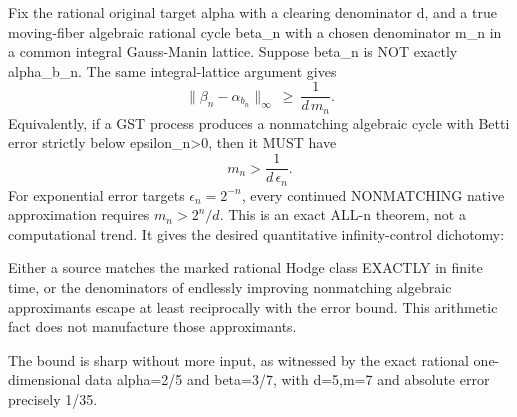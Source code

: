 \documentclass{article}
\begin{document}
Fix the rational original target alpha with
a clearing denominator d, and a true
moving-fiber algebraic rational cycle
beta_n with a chosen denominator m_n
in a common integral Gauss-Manin lattice.
Suppose beta_n is NOT exactly alpha_b_n.
The same integral-lattice argument gives
\[
\boxed{
\|\beta_n-\alpha_{b_n}\|_\infty
\ \ge\ \frac1{d\,m_n}.
}
\]
Equivalently, if a GST process produces
a nonmatching algebraic cycle with
Betti error strictly below epsilon_n>0,
then it MUST have
\[
\boxed{
m_n>\frac1{d\,\epsilon_n}.
}
\]
For exponential error targets
$\epsilon_n=2^{-n}$,
every continued NONMATCHING native
approximation requires
$m_n>2^n/d$.
This is an exact ALL-n theorem, not a
computational trend.
It gives the desired quantitative
infinity-control dichotomy:

Either a source matches the marked
rational Hodge class EXACTLY in finite time,
or the denominators of endlessly improving
nonmatching algebraic approximants
escape at least reciprocally with the
error bound. This arithmetic fact
does not manufacture those approximants.

The bound is sharp without more input,
as witnessed by the exact rational
one-dimensional data alpha=2/5 and
beta=3/7, with d=5,m=7 and
absolute error precisely 1/35.
\end{document}
